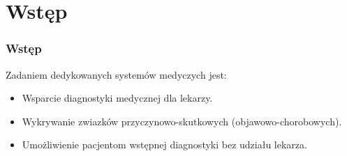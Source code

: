 \section{Wstęp}

\begin{frame}
\frametitle{Wstęp}

Zadaniem dedykowanych systemów medyczych jest:
\begin{itemize}
 \item Wsparcie diagnostyki medycznej dla lekarzy.
 \item Wykrywanie zwiazków przyczynowo-skutkowych (objawowo-chorobowych).
 \item Umożliwienie pacjentom wstępnej diagnostyki bez udziału lekarza.
\end{itemize}

\end{frame}

